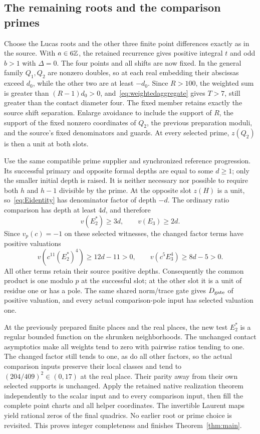 \documentclass[11pt]{article}
\theoremstyle{remark}\newtheorem{remark}[theorem]{Remark}
\begin{document}
\subsection*{The remaining roots and the comparison primes}
Choose the Lucas roots and the other three finite point differences
exactly as in the source. With $a\in6\mathbb Z$, the retained recurrence
gives positive integral $t$ and odd $b>1$ with $\Delta=0$.
The four points and all shifts are now fixed. In the general family
$Q_1,Q_2$ are nonzero doubles, so at each real embedding their
abscissas exceed $d_0$, while the other two are at least $-d_0$.
Since $R>100$, the weighted sum is greater than $(R-1)d_0>0$,
and~\eqref{eq:weightedaggregate} gives $T>7$, still greater than
the contact diameter four. The fixed member retains exactly the
source shift separation. Enlarge avoidance to include the support of $R$,
the support of the
fixed nonzero coordinates of $Q_2$, the previous preparation
moduli, and the source's fixed denominators and guards.
At every selected prime, $z(Q_2)$ is then a unit at both slots.

Use the same compatible prime supplier and synchronized reference
progression. Its successful primary and opposite formal depths
are equal to some $d\ge1$; only the smaller initial depth is raised.
It is neither necessary nor possible to require both $h$ and
$h-1$ divisible by the prime. At the opposite slot $z(H)$ is a
unit, so~\eqref{eq:Eidentity} has denominator factor of depth
$-d$. The ordinary ratio comparison has depth at least $4d$,
and therefore
\[
                  v(E_2^*)\ge3d,\qquad v(E_3)\ge2d.
\]
Since $v_p(c)=-1$ on these selected witnesses, the changed factor
terms have positive valuations
\[
              v(c^{11}(E_2^*)^4)\ge12d-11>0,
 \qquad v(c^5E_3^4)\ge8d-5>0.
\]
All other terms retain their source positive depths. Consequently
the common product is one modulo $p$ at the successful slot; at
the other slot it is a unit of residue one or has a pole. The
same shared norm/trace gate gives $D_{\rm gate}$ of positive
valuation, and every actual comparison-pole input has selected
valuation one.

At the previously prepared finite places and the real places,
the new test $E_2^*$ is a regular bounded function on the shrunken
neighborhoods. The unchanged contact asymptotics make all weights
tend to zero with pairwise ratios tending to one. The changed
factor still tends to one, as do all other factors, so the actual
comparison inputs preserve their local classes and tend to
$(204/409)^2\in(0,17)$ at the real place. Their parity away from
their own selected supports is unchanged. Apply the retained native
realization theorem independently to the scalar input and to every
comparison input, then fill the complete point charts and all helper
coordinates. The invertible Laurent maps yield rational zeros of
the final quadrics. No earlier root or prime choice is revisited.
This proves integer completeness and finishes Theorem~\ref{thm:main}.
\end{document}
